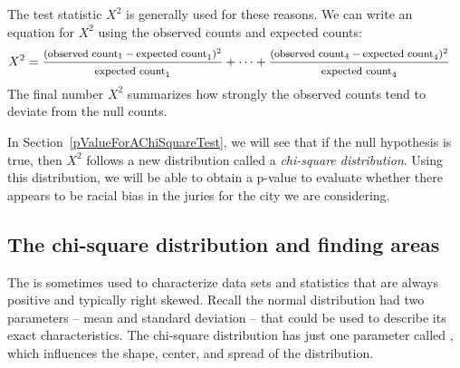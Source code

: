 The test statistic $X^2$ is generally used for these reasons. We can write an equation for $X^2$ using the observed counts and expected counts:
{\begin{align*}
X^2 &=
	\frac
	{\text{\footnotesize$(\text{observed count}_1 - \text{expected count}_1)^2$}}
	{\text{\footnotesize$\text{expected count}_1$}}
	+ \dots + \frac
	{\text{\footnotesize$(\text{observed count}_4 - \text{expected count}_4)^2$}}
	{\text{\footnotesize$\text{expected count}_4$}}
\end{align*}
}The final number $X^2$ summarizes how strongly the observed counts tend to deviate from the null counts.

In Section~\ref{pValueForAChiSquareTest}, we will see that if the null hypothesis is true, then $X^2$ follows a new distribution called a \emph{chi-square distribution}. Using this distribution, we will be able to obtain a p-value to evaluate whether there appears to be racial bias in the juries for the city we are considering.


\subsection{The chi-square distribution and finding areas}

The  is sometimes used to characterize data sets and statistics that are always positive and typically right skewed. Recall the normal distribution had two parameters -- mean and standard deviation -- that could be used to describe its exact characteristics. The chi-square distribution has just one parameter called , which influences the shape, center, and spread of the distribution.

